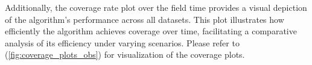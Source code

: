 
\vspace*{6mm}

Additionally, the coverage rate plot over the field time provides a visual depiction of the algorithm's performance across all datasets. This plot illustrates how efficiently the algorithm achieves coverage over time, facilitating a comparative analysis of its efficiency under varying scenarios. Please refer to (\autoref{fig:coverage_plots_obs}) for visualization of the coverage plots.

